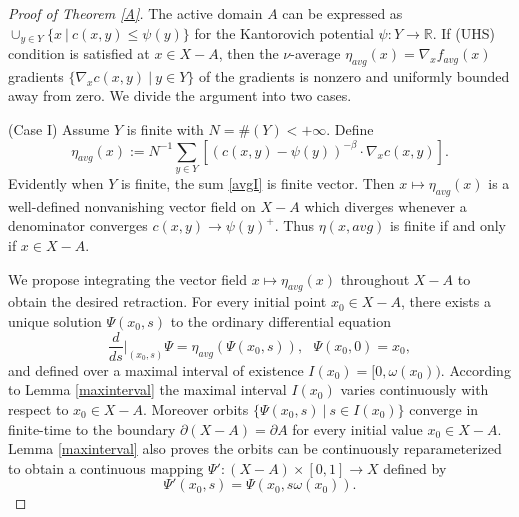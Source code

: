 \documentclass[12pt]{amsart}
\theoremstyle{definition}
\theoremstyle{remark}
\newcommand{\bR}{\mathbb{R}}
\newcommand{\del}{\partial}
\begin{document}
\begin{proof}
[Proof of Theorem \ref{A}] 
The active domain $A$ can be expressed as $\cup_{y \in Y} \{x~|~ c(x,y) \leq \psi(y)\}$ for the Kantorovich potential $\psi: Y \to \bR$. If (UHS) condition is satisfied at $x\in X - A$, then the $\nu$-average $\eta_{avg}(x)=\nabla_x f_{avg}(x)$ gradients $\{\nabla_x c(x,y) ~|~ y \in Y\}$ of the gradients is nonzero and uniformly bounded away from zero. We divide the argument into two cases. 

(Case I) Assume $Y$ is finite with $N=\#(Y) <+\infty$.
Define \begin{equation}
\eta_{avg}(x):=N^{-1} \sum_{y \in Y}[(c(x,y)-\psi(y))^{-\beta}\cdot\nabla_x c(x,y)].  \label{avgI}
\end{equation}  Evidently when $Y$ is finite, the sum \eqref{avgI} is finite vector. Then $x\mapsto \eta_{avg}(x)$ is a well-defined nonvanishing vector field on $X-A$ which diverges whenever a denominator converges $c(x,y) \to \psi(y)^+$. Thus $\eta(x, avg)$ is finite if and only if $x\in X-A$. 

We propose integrating the vector field $x\mapsto \eta_{avg}(x)$ throughout $X-A$ to obtain the desired retraction. For every initial point $x_0 \in X-A$, there exists a unique solution $\Psi(x_0, s)$ to the ordinary differential equation 
\begin{equation} 
\frac{d}{ds}|_{(x_0,s)} \Psi=\eta_{avg}(\Psi(x_0,s)), ~~~ \Psi(x_0, 0)=x_0,   \label{ode}
\end{equation} and defined over a maximal interval of existence $I(x_0)=[0, \omega(x_0))$. According to Lemma \ref{maxinterval} the maximal interval $I(x_0)$ varies continuously with respect to $x_0 \in X-A$. Moreover orbits $\{\Psi(x_0,s)~|~ s\in I(x_0)\}$ converge in finite-time to the boundary $\del(X-A)=\del A$ for every initial value $x_0\in X-A$. Lemma \ref{maxinterval} also proves the orbits can be continuously reparameterized to obtain a continuous mapping $\Psi': (X-A) \times [0,1] \to X$ defined by \begin{equation}\label{reparam} \Psi'(x_0,s)=\Psi(x_0, s \omega(x_0)).\end{equation}






\end{proof}
\end{document}
